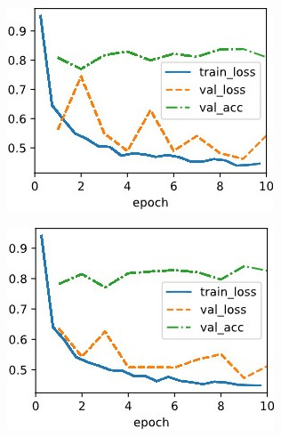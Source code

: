 \documentclass{article}
\begin{document}
\begin{figure}[ht]
\begin{center}
\begin{subfigure}[b]{0.3\columnwidth}
      \includegraphics[width=\columnwidth]{img/lr0.2 cosine0.1.jpg}
   \end{subfigure}
   \hfill
   \begin{subfigure}[b]{0.3\columnwidth}\centering
      \includegraphics[width=\columnwidth]{img/lr0.2 cosine0.05.jpg}
   \end{subfigure}
   \hfill
   \begin{subfigure}[b]{0.3\columnwidth}\centering

\end{subfigure}
\end{center}
\end{figure}
\end{document}
